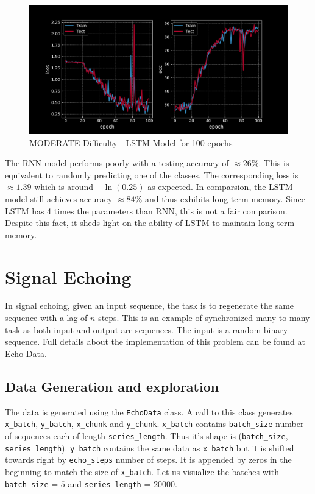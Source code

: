 \begin{figure}[H]
    \centering
    \includegraphics[width=0.5\linewidth]{figs/lstm_moderate_100.png}
    \caption{MODERATE Difficulty - LSTM Model for 100 epochs}
    \label{fig:lstm_moderate_100}
\end{figure}

The RNN model performs poorly with a testing accuracy of $\approx 26\%$. This is equivalent to randomly predicting one of the classes. The corresponding loss is $\approx 1.39$ which is around $-\ln(0.25)$ as expected. In comparsion, the LSTM model still achieves accuracy $\approx 84\%$ and thus exhibits long-term memory. Since LSTM has 4 times the parameters than RNN, this is not a fair comparison. Despite this fact, it sheds light on the ability of LSTM to maintain long-term memory.

\section{Signal Echoing}
In signal echoing, given an input sequence, the task is to regenerate the same sequence with a lag of $n$ steps. 
This is an example of synchronized many-to-many task as both input and output are sequences. 
The input is a random binary sequence. 
Full details about the implementation of this problem can be found at \href{https://github.com/Atcold/pytorch-Deep-Learning-Minicourse/blob/master/09-echo\_data.ipynb}{Echo Data}.

\subsection{Data Generation and exploration}
The data is generated using the \texttt{EchoData} class. A call to this class generates \texttt{x\_batch}, \texttt{y\_batch}, \texttt{x\_chunk} and \texttt{y\_chunk}.
\texttt{x\_batch} contains \texttt{batch\_size} number of sequences each of length \texttt{series\_length}. Thus it's shape is (\texttt{batch\_size}, \texttt{series\_length}).
\texttt{y\_batch} contains the same data as \texttt{x\_batch} but it is shifted towards right by \texttt{echo\_steps} number of steps. It is appended by zeros in the beginning to match the size of \texttt{x\_batch}. 
Let us visualize the batches with \texttt{batch\_size} = $5$ and \texttt{series\_length} = $20000$.


